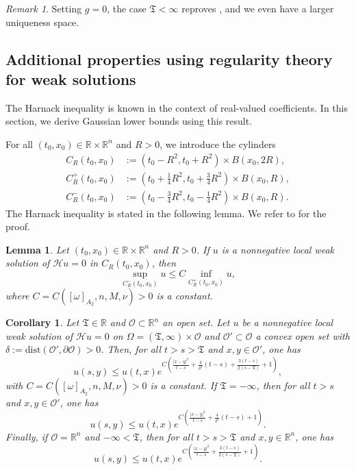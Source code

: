 \documentclass[12pt, letterpaper]{amsart}
\newtheorem{cor}[thm]{Corollary}
\newtheorem{lem}[thm]{Lemma}
\theoremstyle{definition}
\theoremstyle{remark}
\newtheorem{rem}[thm]{Remark}
\numberwithin{equation}{section}
\begin{document}
\begin{rem}
    Setting $g=0$, the case $\mathfrak{T}<\infty$ reproves \cite[Theorem 1.2]{ataei2024fundamental}, and we even have a larger uniqueness space.
\end{rem}

\subsection{Additional properties using regularity theory for weak solutions}
The Harnack inequality is known in the context of real-valued coefficients. In this section, we derive Gaussian lower bounds using this result.


For all $(t_0,x_0) \in \mathbb{R} \times \mathbb{R}^n$ and $R>0$, we introduce the cylinders
\begin{align*}
    C_R(t_0,x_0)&:=(t_0-R^2,t_0+R^2) \times B(x_0, 2R),\\
    C^+_R(t_0,x_0)&:=(t_0+\frac{1}{4}R^2,t_0+\frac{3}{4}R^2)\times B(x_0,R),\\
    C^-_R(t_0,x_0)&:=(t_0-\frac{3}{4}R^2,t_0-\frac{1}{4}R^2)\times B(x_0,R).
\end{align*}
The Harnack inequality is stated in the following lemma. We refer to \cite[Thm. A]{ishige1999behavior} for the proof.
\begin{lem}\label{lem:Harnack}
    Let $(t_0,x_0)\in \mathbb{R} \times \mathbb{R}^n$ and $R>0$. If $u$ is a nonnegative local weak solution of $\mathcal{H}u=0$ in $C_R(t_0,x_0)$, then 
    \begin{equation*}
        \sup_{C^-_R(t_0,x_0)} u   \leq C \inf_{C^+_R(t_0,x_0)} u,
    \end{equation*}
    where $C=C([ \omega  ]_{A_2},n,M,\nu)>0$ is a constant.
\end{lem}
\begin{cor}
    Let $\mathfrak{T}\in \mathbb{R}$ and $\mathcal{O} \subset \mathbb{R}^n$ an open set. Let $u$ be a nonnegative local weak solution of $\mathcal{H}u=0$ on $\Omega= (\mathfrak{T},\infty)\times \mathcal{O}$ and $\mathcal{O'}\subset \mathcal{O}$ a convex open set with $\delta:=\mathrm{dist}(\mathcal{O'},\partial \mathcal{O})>0$. Then, for all $t>s>\mathfrak{T}$ and $x,y \in \mathcal{O'}$, one has
    \begin{equation*}
        u(s,y) \leq u(t,x)  e^{C\left ( \frac{\left | x-y\right |^2}{t-s}+\frac{4}{\delta^2}(t-s)+\frac{3(t-s)}{2(s-\mathfrak{T})}+1 \right )},
    \end{equation*}
    with $C=C([ \omega  ]_{A_2},n,M,\nu)>0$ is a constant. If $\mathfrak{T}=-\infty$, then for all $t>s$ and $x,y \in \mathcal{O'}$, one has
    \begin{equation}\label{199.5}
        u(s,y) \leq u(t,x)  e^{C\left ( \frac{\left | x-y\right |^2}{t-s}+\frac{4}{\delta^2}(t-s)+1 \right )}.
    \end{equation}
    Finally, if $\mathcal{O}=\mathbb{R}^n$ and $-\infty<\mathfrak{T}$, then for all $t>s>\mathfrak{T}$ and $x,y \in \mathbb{R}^n$, one has
    \begin{equation}\label{200}
        u(s,y) \leq u(t,x)  e^{C ( \frac{\left | x-y\right |^2}{t-s}+\frac{3(t-s)}{2(s-\mathfrak{T})}+1  )}.
    \end{equation}
\end{cor}
\end{document}
